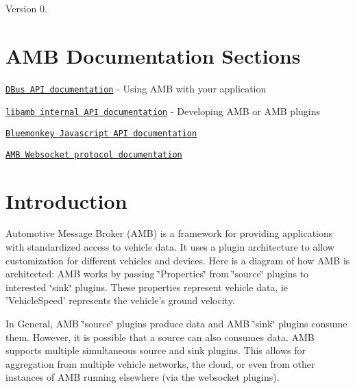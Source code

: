\begin{DoxyVersion}{Version}
0. 
\end{DoxyVersion}
\hypertarget{index_links}{}\section{A\+M\+B Documentation Sections}\label{index_links}

\begin{DoxyItemize}
\item \href{../dbus/html/index.html}{\tt D\+Bus A\+P\+I documentation} -\/ Using A\+M\+B with your application
\item \href{../amb/html/index.html}{\tt libamb internal A\+P\+I documentation} -\/ Developing A\+M\+B or A\+M\+B plugins
\item \href{../plugins/bluemonkey/html/index.html}{\tt Bluemonkey Javascript A\+P\+I documentation}
\item \href{../plugins/websocket/html/index.html}{\tt A\+M\+B Websocket protocol documentation} 
\end{DoxyItemize}\hypertarget{index_intro}{}\section{Introduction}\label{index_intro}
Automotive Message Broker (A\+M\+B) is a framework for providing applications with standardized access to vehicle data. It uses a plugin architecture to allow customization for different vehicles and devices. Here is a diagram of how A\+M\+B is architected\+:  A\+M\+B works by passing \char`\"{}\+Properties\char`\"{} from \char`\"{}source\char`\"{} plugins to interested \char`\"{}sink\char`\"{} plugins. These properties represent vehicle data, ie 'Vehicle\+Speed' represents the vehicle's ground velocity.

In General, A\+M\+B \char`\"{}source\char`\"{} plugins produce data and A\+M\+B \char`\"{}sink\char`\"{} plugins consume them. However, it is possible that a source can also consumes data. A\+M\+B supports multiple simultaneous source and sink plugins. This allows for aggregation from multiple vehicle networks, the cloud, or even from other instances of A\+M\+B running elsewhere (via the websocket plugins).

